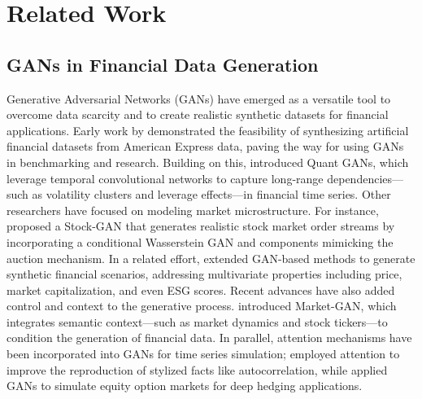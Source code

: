 \section{Related Work}
\subsection{GANs in Financial Data Generation}
Generative Adversarial Networks (GANs) have emerged as a versatile tool to overcome data scarcity and to create realistic synthetic datasets for financial applications. Early work by \cite{efimov2020using} demonstrated the feasibility of synthesizing artificial financial datasets from American Express data, paving the way for using GANs in benchmarking and research. Building on this, \cite{wiese2019quant} introduced Quant GANs, which leverage temporal convolutional networks to capture long-range dependencies—such as volatility clusters and leverage effects—in financial time series.
Other researchers have focused on modeling market microstructure. For instance, \cite{li2020generating} proposed a Stock-GAN that generates realistic stock market order streams by incorporating a conditional Wasserstein GAN and components mimicking the auction mechanism. In a related effort, \cite{rizzato2022generative} extended GAN-based methods to generate synthetic financial scenarios, addressing multivariate properties including price, market capitalization, and even ESG scores. Recent advances have also added control and context to the generative process. \cite{xia2023market} introduced Market-GAN, which integrates semantic context—such as market dynamics and stock tickers—to condition the generation of financial data. In parallel, attention mechanisms have been incorporated into GANs for time series simulation; \cite{fu2022simulating} employed attention to improve the reproduction of stylized facts like autocorrelation, while \cite{wiese2019deep} applied GANs to simulate equity option markets for deep hedging applications.

